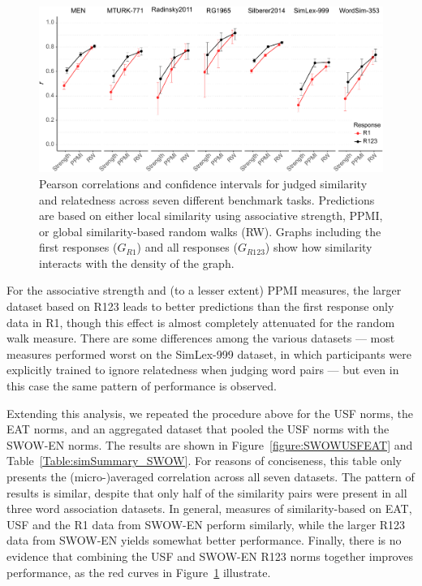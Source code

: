 \documentclass[a4paper,doc,natbib,floatsintext]{apa6}
\begin{document}
\begin{figure}[!ht]
\centering
\includegraphics[width=14.8cm]{figures/SimilarityComparison.pdf}
\caption{Pearson correlations and confidence intervals for judged similarity and relatedness across seven different benchmark tasks. Predictions are based on either local similarity using associative strength, PPMI, or global similarity-based random walks (RW). Graphs including the first responses ($G_{R1}$) and all responses ($G_{R123}$) show how similarity interacts with the density of the graph.} \label{figure:SWOWSimilarity}
\end{figure}


For the associative strength and (to a lesser extent) PPMI measures, the larger dataset based on R123 leads to better predictions than the first response only data in R1, though this effect is almost completely attenuated for the random walk measure. There are some differences among the various datasets --- most measures performed worst on the SimLex-999 dataset, in which participants were explicitly trained to ignore relatedness when judging word pairs --- but even in this case the same pattern of performance is observed.

Extending this analysis, we repeated the procedure above for the USF norms, the EAT norms, and an aggregated dataset that pooled the USF norms with the SWOW-EN norms. The results are shown in Figure~\ref{figure:SWOWUSFEAT} and Table~\ref{Table:simSummary_SWOW}.
For reasons of conciseness, this table only presents the (micro-)averaged correlation across all seven datasets. The pattern of results is similar, despite that only half of the similarity pairs were present in all three word association datasets. In general, measures of similarity-based on EAT, USF and the R1 data from SWOW-EN perform similarly, while the larger R123 data from SWOW-EN yields somewhat better performance. Finally, there is no evidence that combining the USF and SWOW-EN R123 norms together improves performance, as the red curves in Figure~\ref{figure:SWOWSimilarity} illustrate.
\end{document}
